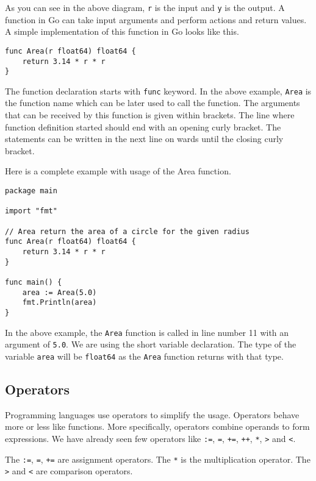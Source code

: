 As you can see in the above diagram, \texttt{r} is the input
and \texttt{y} is the output.  A function in Go can take input
arguments and perform actions and return values.  A simple
implementation of this function in Go looks like this.

\begin{lstlisting}[numbers=none]
func Area(r float64) float64 {
    return 3.14 * r * r
}
\end{lstlisting}

The function declaration starts with \texttt{func} keyword.  In the
above example, \texttt{Area} is the function name which can be later
used to call the function.  The arguments that can be received by this
function is given within brackets.  The line where function definition
started should end with an opening curly bracket.  The statements can
be written in the next line on wards until the closing curly bracket.

Here is a complete example with usage of the Area function.

\begin{lstlisting}
package main

import "fmt"

// Area return the area of a circle for the given radius
func Area(r float64) float64 {
    return 3.14 * r * r
}

func main() {
    area := Area(5.0)
    fmt.Println(area)
}
\end{lstlisting}

In the above example, the \texttt{Area} function is called in line
number 11 with an argument of \texttt{5.0}.  We are using the short
variable declaration.  The type of the variable \texttt{area} will be
\texttt{float64} as the \texttt{Area} function returns with that type.

\subsection{Operators}

Programming languages use operators to simplify the
usage.  Operators behave more or less like functions.  More
specifically, operators combine operands to form expressions.  We have
already seen few operators
like \texttt{:=}, \texttt{=}, \texttt{+=}, \texttt{++}, \texttt{*},
\texttt{>} and \texttt{<}.

The \texttt{:=}, \texttt{=}, \texttt{+=} are assignment operators.
The \texttt{*} is the multiplication operator.  The \texttt{>}
and \texttt{<} are comparison operators.

